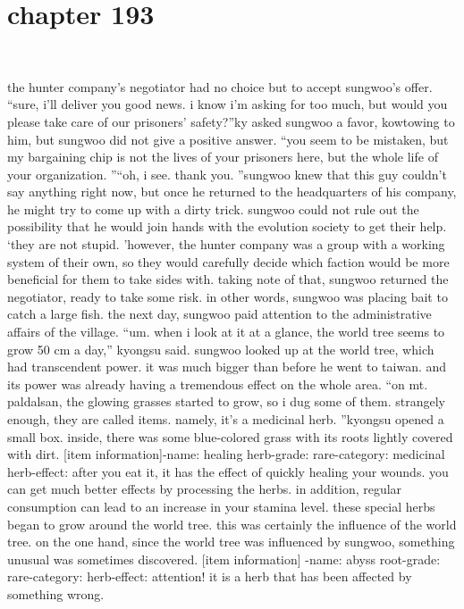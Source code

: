 \section{chapter 193}

                             




the hunter company’s negotiator had no choice but to accept sungwoo’s offer.
“sure, i’ll deliver you good news.
 i know i’m asking for too much, but would you please take care of our prisoners’ safety?”ky asked sungwoo a favor, kowtowing to him, but sungwoo did not give a positive answer.
“you seem to be mistaken, but my bargaining chip is not the lives of your prisoners here, but the whole life of your organization.
”“oh, i see.
 thank you.
”sungwoo knew that this guy couldn’t say anything right now, but once he returned to the headquarters of his company, he might try to come up with a dirty trick.
 sungwoo could not rule out the possibility that he would join hands with the evolution society to get their help.
‘they are not stupid.
’however, the hunter company was a group with a working system of their own, so they would carefully decide which faction would be more beneficial for them to take sides with.
taking note of that, sungwoo returned the negotiator, ready to take some risk.
 in other words, sungwoo was placing bait to catch a large fish.
the next day, sungwoo paid attention to the administrative affairs of the village.
“um.
 when i look at it at a glance, the world tree seems to grow 50 cm a day,” kyongsu said.
 sungwoo looked up at the world tree, which had transcendent power.
it was much bigger than before he went to taiwan.
 and its power was already having a tremendous effect on the whole area.
“on mt.
 paldalsan, the glowing grasses started to grow, so i dug some of them.
 strangely enough, they are called items.
 namely, it’s a medicinal herb.
”kyongsu opened a small box.
 inside, there was some blue-colored grass with its roots lightly covered with dirt.
[item information]-name: healing herb-grade: rare-category: medicinal herb-effect: after you eat it, it has the effect of quickly healing your wounds.
 you can get much better effects by processing the herbs.
 in addition, regular consumption can lead to an increase in your stamina level.
these special herbs began to grow around the world tree.
 this was certainly the influence of the world tree.
on the one hand, since the world tree was influenced by sungwoo, something unusual was sometimes discovered.
[item information]
-name: abyss root-grade: rare-category: herb-effect: attention! it is a herb that has been affected by something wrong.
